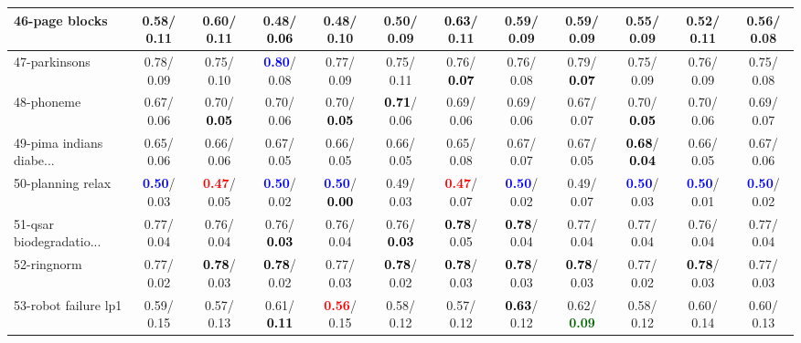 \begin{table}[h]
\begin{center}
{\begin{tabular}{lc|c|c|c|c|c|c|c|c|c|c}
46-page blocks &   0.58/  0.11 &   0.60/  0.11 &   0.48/\textcolor{black}{\textbf{  0.06}} &   0.48/  0.10 &   0.50/  0.09 & \textcolor{black}{\textbf{  0.63}}/  0.11 &   0.59/  0.09 &   0.59/  0.09 &   0.55/  0.09 &   0.52/  0.11 &   0.56/  0.08 \\ \hline
47-parkinsons &   0.78/  0.09 &   0.75/  0.10 & \textcolor{blue}{\textbf{  0.80}}/  0.08 &   0.77/  0.09 &   0.75/  0.11 &   0.76/\textcolor{black}{\textbf{  0.07}} &   0.76/  0.08 &   0.79/\textcolor{black}{\textbf{  0.07}} &   0.75/  0.09 &   0.76/  0.09 &   0.75/  0.08 \\
48-phoneme &   0.67/  0.06 &   0.70/\textcolor{black}{\textbf{  0.05}} &   0.70/  0.06 &   0.70/\textcolor{black}{\textbf{  0.05}} & \textcolor{black}{\textbf{  0.71}}/  0.06 &   0.69/  0.06 &   0.69/  0.06 &   0.67/  0.07 &   0.70/\textcolor{black}{\textbf{  0.05}} &   0.70/  0.06 &   0.69/  0.07 \\
49-pima indians diabe... &   0.65/  0.06 &   0.66/  0.06 &   0.67/  0.05 &   0.66/  0.05 &   0.66/  0.05 &   0.65/  0.08 &   0.67/  0.07 &   0.67/  0.05 & \textcolor{black}{\textbf{  0.68}}/\textcolor{black}{\textbf{  0.04}} &   0.66/  0.05 &   0.67/  0.06 \\
50-planning relax & \textcolor{blue}{\textbf{  0.50}}/  0.03 & \textcolor{red}{\textbf{  0.47}}/  0.05 & \textcolor{blue}{\textbf{  0.50}}/  0.02 & \textcolor{blue}{\textbf{  0.50}}/\textcolor{black}{\textbf{  0.00}} &   0.49/  0.03 & \textcolor{red}{\textbf{  0.47}}/  0.07 & \textcolor{blue}{\textbf{  0.50}}/  0.02 &   0.49/  0.07 & \textcolor{blue}{\textbf{  0.50}}/  0.03 & \textcolor{blue}{\textbf{  0.50}}/  0.01 & \textcolor{blue}{\textbf{  0.50}}/  0.02 \\
51-qsar biodegradatio... &   0.77/  0.04 &   0.76/  0.04 &   0.76/\textcolor{black}{\textbf{  0.03}} &   0.76/  0.04 &   0.76/\textcolor{black}{\textbf{  0.03}} & \textcolor{black}{\textbf{  0.78}}/  0.05 & \textcolor{black}{\textbf{  0.78}}/  0.04 &   0.77/  0.04 &   0.77/  0.04 &   0.76/  0.04 &   0.77/  0.04 \\
52-ringnorm &   0.77/  0.02 & \textcolor{black}{\textbf{  0.78}}/  0.03 & \textcolor{black}{\textbf{  0.78}}/  0.02 &   0.77/  0.03 & \textcolor{black}{\textbf{  0.78}}/  0.02 & \textcolor{black}{\textbf{  0.78}}/  0.03 & \textcolor{black}{\textbf{  0.78}}/  0.03 & \textcolor{black}{\textbf{  0.78}}/  0.03 &   0.77/  0.02 & \textcolor{black}{\textbf{  0.78}}/  0.03 &   0.77/  0.03 \\
53-robot failure lp1 &   0.59/  0.15 &   0.57/  0.13 &   0.61/\textcolor{black}{\textbf{  0.11}} & \textcolor{red}{\textbf{  0.56}}/  0.15 &   0.58/  0.12 &   0.57/  0.12 & \textcolor{black}{\textbf{  0.63}}/  0.12 &   0.62/\textcolor{darkgreen}{\textbf{  0.09}} &   0.58/  0.12 &   0.60/  0.14 &   0.60/  0.13 \\ \hline

\end{tabular}}
\end{center}
\end{table}
